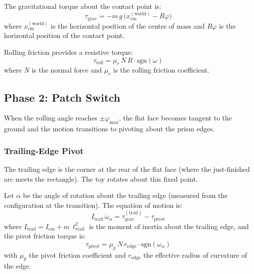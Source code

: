 \documentclass[11pt,a4paper]{article}
\newcommand{\cm}{\mathrm{cm}}
\theoremstyle{plain}
\theoremstyle{definition}
\theoremstyle{remark}
\begin{document}
The gravitational torque about the contact point is:
\begin{equation}
    \tau_{\mathrm{grav}} = -m\,g\,\bigl(x_{\cm}^{(\mathrm{world})} - R\varphi\bigr)
    \label{eq:tau-grav-rolling}
\end{equation}
where $x_{\cm}^{(\mathrm{world})}$ is the horizontal position of the centre of mass and $R\varphi$ is the horizontal position of the contact point.

Rolling friction provides a resistive torque:
\begin{equation}
    \tau_{\mathrm{roll}} = \mu_r\, N\, R \cdot \mathrm{sgn}(\omega)
    \label{eq:tau-roll}
\end{equation}
where $N$ is the normal force and $\mu_r$ is the rolling friction coefficient.


\subsection{Phase 2: Patch Switch}
\label{sec:phase2}

When the rolling angle reaches $\pm\varphi_{\max}$, the flat face becomes tangent to the ground and the motion transitions to pivoting about the prism edges.

\subsubsection{Trailing-Edge Pivot}

The trailing edge is the corner at the rear of the flat face (where the just-finished arc meets the rectangle).  The toy rotates about this fixed point.

Let $\alpha$ be the angle of rotation about the trailing edge (measured from the configuration at the transition).  The equation of motion is:
\begin{equation}
    I_{\mathrm{trail}}\,\dot{\omega}_{\alpha} = \tau_{\mathrm{grav}}^{(\mathrm{trail})} - \tau_{\mathrm{pivot}}
    \label{eq:eom-trailing}
\end{equation}
where $I_{\mathrm{trail}} = I_{\cm} + m\,\ell_{\mathrm{trail}}^2$ is the moment of inertia about the trailing edge, and the pivot friction torque is:
\begin{equation}
    \tau_{\mathrm{pivot}} = \mu_p\, N\, r_{\mathrm{edge}} \cdot \mathrm{sgn}(\omega_\alpha)
    \label{eq:tau-pivot}
\end{equation}
with $\mu_p$ the pivot friction coefficient and $r_{\mathrm{edge}}$ the effective radius of curvature of the edge.
\end{document}
